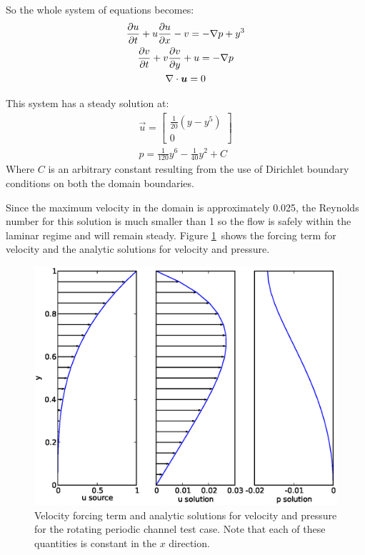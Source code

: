 So the whole system of equations becomes:
\begin{gather}
  \ppt{u}+u\ppt[x]{u}-v=-\grad p +y^3\\
  \ppt{v}+v\ppt[y]{v}+u=-\grad p \\
  \div\vec{u}=0
\end{gather}

This system has a steady solution at:
\begin{gather}
  \vec{u}=
  \begin{bmatrix}
    \frac{1}{20}(y-y^5)\\
    0
  \end{bmatrix}\\
  p=\frac{1}{120}y^6-\frac{1}{40}y^2+C
\end{gather}
Where $C$ is an arbitrary constant resulting from the use of Dirichlet
boundary conditions on both the domain boundaries.

Since the maximum velocity in the domain is approximately 0.025, the
Reynolds number for this solution is much smaller than 1 so the flow is
safely within the laminar regime and will remain steady. Figure
\ref{fig:periodic_channel}\ shows the forcing term for velocity and the
analytic solutions for velocity and pressure.


\begin{figure}[ht]
  \centering
  \onlypdf{\begin{pdfdisplay}}
    \includegraphics[width=1.1\textwidth]{examples_images/rotating_channel/analytic_solution.eps}
  \onlypdf{\end{pdfdisplay}}
  \caption{Velocity forcing term and analytic solutions for velocity and
    pressure for the rotating periodic channel test case. Note that each of
    these quantities is constant in the $x$ direction.}
  \label{fig:periodic_channel}
\end{figure}

